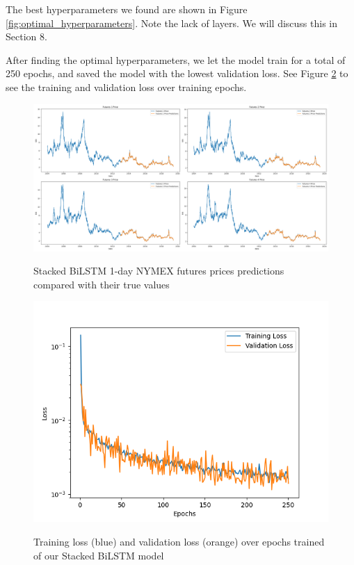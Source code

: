 \documentclass[final]{cvpr}
\begin{document}
    The best hyperparameters we found are shown in Figure
    \ref{fig:optimal_hyperparameters}. Note the lack of layers. We will discuss 
    this in Section 8.

    After finding the optimal hyperparameters, we let the model train for a 
    total of 250 epochs, and saved the model with the lowest validation loss.
    See Figure \ref{fig:loss_over_epochs} to see the training and validation 
    loss over training epochs.

    \begin{figure}[h]
        \caption{Stacked BiLSTM 1-day NYMEX futures prices predictions compared 
            with their true values}
        \center
        \includegraphics[width=1.0\textwidth]{images/stacked_bilstm_predictions.png}
        \label{fig:predictions_graph}
    \end{figure}

    \begin{figure}[h]
        \caption{Training loss (blue) and validation loss (orange) over epochs
            trained of our Stacked BiLSTM model}
        \center
        \includegraphics[scale=.51]{images/stacked_lstm_loss_over_epoch.png}
        \label{fig:loss_over_epochs}
    \end{figure}
\end{document}
